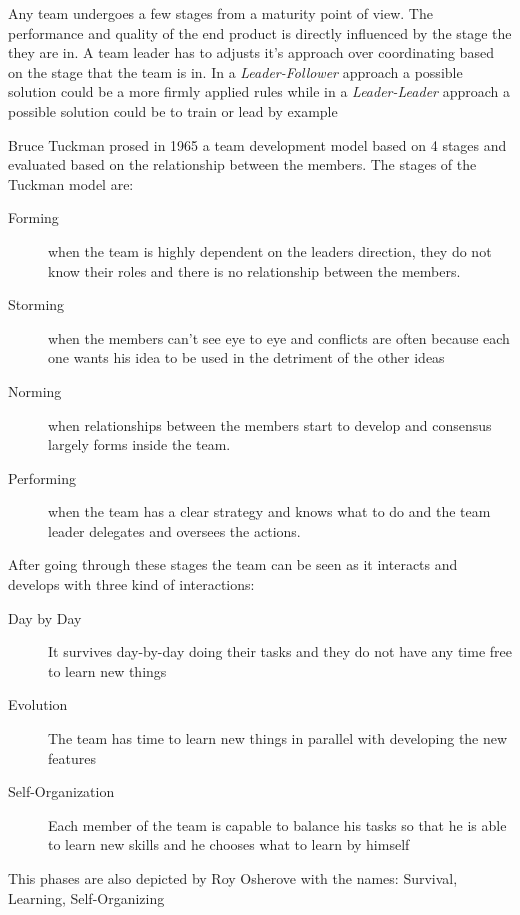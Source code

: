 
Any team undergoes a few stages from a maturity point of view. The performance and quality of the end product is directly influenced by the stage the they are in. A team leader has to adjusts it's approach over coordinating based on the stage that the team is in. In a \textit{Leader-Follower} approach a possible solution could be a more firmly applied rules while in a \textit{Leader-Leader} approach a possible solution could be to train or lead by example

Bruce Tuckman prosed in 1965 a team development model based on 4 stages and evaluated based on the relationship between the members. The stages of the Tuckman model are:
\begin{description}
\item[Forming] when the team is highly dependent on the leaders direction, they do not know their roles and there is no relationship between the members.
\item[Storming] when the members can't see eye to eye and conflicts are often because each one wants his idea to be used in the detriment of the other ideas
\item[Norming] when relationships between the members start to develop and consensus largely forms inside the team.
\item[Performing] when the team has a clear strategy and knows what to do and the team leader delegates and oversees the actions.
\end{description}

After going through these stages the team can be seen as it interacts and develops with three kind of interactions:
\begin{description}
\item [Day by Day] It survives day-by-day doing their tasks and they do not have any time free to learn new things
\item [Evolution] The team has time to learn new things in parallel with developing the new features
\item [Self-Organization] Each member of the team is capable to balance his tasks so that he is able to learn new skills and he chooses what to learn by himself
\end{description}

This phases are also depicted by Roy Osherove \cite{notes-to-a-software-team-leader} with the names: Survival, Learning, Self-Organizing

